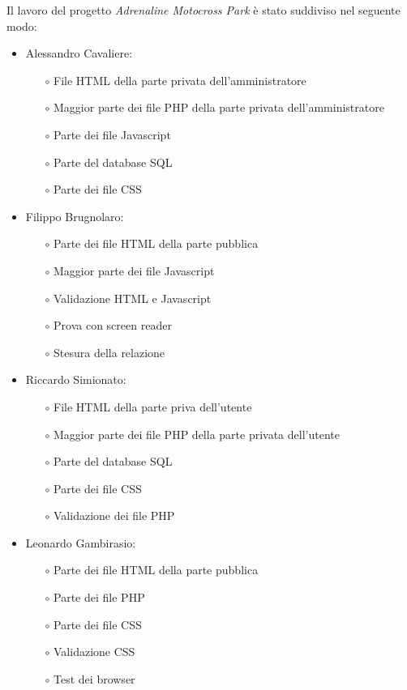 Il lavoro del progetto \textit{Adrenaline Motocross Park} è stato suddiviso nel seguente modo:
\begin{itemize}
    \item Alessandro Cavaliere:
        \begin{itemize}
            \item[$\circ$] File HTML della parte privata dell'amministratore
            \item[$\circ$] Maggior parte dei file PHP della parte privata dell'amministratore
            \item[$\circ$] Parte dei file Javascript
            \item[$\circ$] Parte del database SQL
            \item[$\circ$] Parte dei file CSS
        \end{itemize}
    \item Filippo Brugnolaro:
        \begin{itemize}
            \item[$\circ$] Parte dei file HTML della parte pubblica
            \item[$\circ$] Maggior parte dei file Javascript
            \item[$\circ$] Validazione HTML e Javascript
            \item[$\circ$] Prova con screen reader
            \item[$\circ$] Stesura della relazione
        \end{itemize}
    \item Riccardo Simionato:
        \begin{itemize}
            \item[$\circ$] File HTML della parte priva dell'utente
            \item[$\circ$] Maggior parte dei file PHP della parte privata dell'utente
            \item[$\circ$] Parte del database SQL
            \item[$\circ$] Parte dei file CSS
            \item[$\circ$] Validazione dei file PHP
        \end{itemize}
    \item Leonardo Gambirasio:
        \begin{itemize}
            \item[$\circ$] Parte dei file HTML della parte pubblica
            \item[$\circ$] Parte dei file PHP
            \item[$\circ$] Parte dei file CSS
            \item[$\circ$] Validazione CSS
            \item[$\circ$] Test dei browser
        \end{itemize}
\end{itemize}